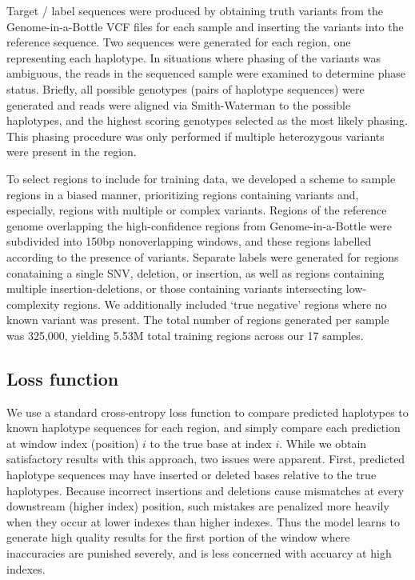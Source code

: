 \documentclass[]{article}
\begin{document}
Target / label sequences were produced by obtaining truth variants from the Genome-in-a-Bottle VCF files for each sample and inserting the variants into the reference sequence. Two sequences were generated for each region, one representing each haplotype. In situations where phasing of the variants was ambiguous, the reads in the sequenced sample were examined to determine phase status. Briefly, all possible genotypes (pairs of haplotype sequences) were generated and reads were aligned via Smith-Waterman to the possible haplotypes, and the highest scoring genotypes selected as the most likely phasing. This phasing procedure was only performed if multiple heterozygous variants were present in the region. 

To select regions to include for training data, we developed a scheme to sample regions in a biased manner, prioritizing regions containing variants and, especially, regions with multiple or complex variants. Regions of the reference genome overlapping the high-confidence regions from Genome-in-a-Bottle were subdivided into 150bp nonoverlapping windows, and these regions labelled according to the presence of variants. Separate labels were generated for regions conataining a single SNV, deletion, or insertion, as well as regions containing multiple insertion-deletions, or those containing variants intersecting  low-complexity regions. We additionally included `true negative' regions where no known variant was present. The total number of regions generated per sample was 325,000, yielding 5.53M total training regions across our 17 samples.

\subsection{Loss function}

We use a standard cross-entropy loss function to compare predicted haplotypes to known haplotype sequences for each region, and simply compare each prediction at window index (position) $i$ to the true base at index $i$.  While we obtain satisfactory results with this approach, two issues were apparent. First, predicted haplotype sequences may have inserted or deleted bases relative to the true haplotypes. Because incorrect insertions and deletions cause mismatches at every downstream (higher index) position, such mistakes are penalized more heavily when they occur at lower indexes than higher indexes. Thus the model learns to generate high quality results for the first portion of the window where inaccuracies are punished severely, and is less concerned with accuarcy at high indexes. 
\end{document}
